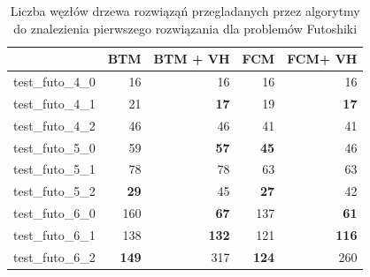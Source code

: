 \documentclass{article}
\begin{document}
	\begin{table}[H]
		\caption{Liczba węzłów drzewa rozwiąząń przegladanych przez algorytmy do znalezienia pierwszego rozwiązania dla problemów Futoshiki}
		\label{tab:vh_mrv}
		\begin{center}
			\begin{tabular}{|l|r|r|r|r|}
				\hline
				& \multicolumn{1}{c|}{\textbf{BTM}} & \multicolumn{1}{l|}{\textbf{BTM + VH}} & \multicolumn{1}{c|}{\textbf{FCM}} & \multicolumn{1}{c|}{\textbf{FCM+ VH}} \\ \hline
				test\_futo\_4\_0 & 16                                     & 16                                          & 16                                     & 16                                          \\ \hline
				test\_futo\_4\_1 & 21                                     & \textbf{17}                                 & 19                                     & \textbf{17}                                 \\ \hline
				test\_futo\_4\_2 & 46                                     & 46                                          & 41                                     & 41                                          \\ \hline
				test\_futo\_5\_0 & 59                                     & \textbf{57}                                 & \textbf{45}                            & 46                                          \\ \hline
				test\_futo\_5\_1 & 78                                     & 78                                          & 63                                     & 63                                          \\ \hline
				test\_futo\_5\_2 & \textbf{29}                            & 45                                          & \textbf{27}                            & 42                                          \\ \hline
				test\_futo\_6\_0 & 160                                    & \textbf{67}                                 & 137                                    & \textbf{61}                                 \\ \hline
				test\_futo\_6\_1 & 138                                    & \textbf{132}                                & 121                                    & \textbf{116}                                \\ \hline
				test\_futo\_6\_2 & \textbf{149}                           & 317                                         & \textbf{124}                           & 260                                         \\ \hline

\end{tabular}
\end{center}
\end{table}
\end{document}
